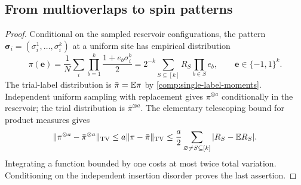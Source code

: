 \subsection{From multioverlaps to spin patterns}


\begin{proof}
Conditional on the sampled reservoir configurations, the pattern
$\boldsymbol\sigma_i=(\sigma_i^1,\ldots,\sigma_i^k)$ at a uniform site
has empirical distribution
\[
 \pi(\boldsymbol e)=\frac1N\sum_i
 \prod_{b=1}^k\frac{1+e_b\sigma_i^b}{2}
 =2^{-k}\sum_{S\subseteq[k]}R_S\prod_{b\in S}e_b,
 \qquad \boldsymbol e\in\{-1,1\}^k.
\]
The trial-label distribution is $\bar\pi=\mathbb E\pi$ by
\eqref{comp:single-label-moments}. Independent uniform sampling with
replacement gives $\pi^{\otimes a}$ conditionally in the reservoir; the
trial distribution is $\bar\pi^{\otimes a}$. The elementary telescoping
bound for product measures gives
\[
 \lVert\pi^{\otimes a}-\bar\pi^{\otimes a}\rVert_{\rm TV}
 \le a\lVert\pi-\bar\pi\rVert_{\rm TV}
 \le\frac a2\sum_{\varnothing\ne S\subseteq[k]}|R_S-\mathbb E R_S|.
\]
Integrating a function bounded by one costs at most twice total variation.
Conditioning on the independent insertion disorder proves the last assertion.
\end{proof}

